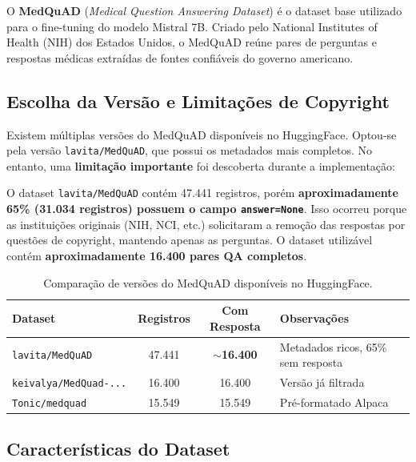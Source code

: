 O \textbf{MedQuAD} (\textit{Medical Question Answering Dataset}) é o dataset base utilizado para o fine-tuning do modelo Mistral 7B. Criado pelo National Institutes of Health (NIH) dos Estados Unidos, o MedQuAD reúne pares de perguntas e respostas médicas extraídas de fontes confiáveis do governo americano.

\subsection{Escolha da Versão e Limitações de Copyright}

Existem múltiplas versões do MedQuAD disponíveis no HuggingFace. Optou-se pela versão \texttt{lavita/MedQuAD}, que possui os metadados mais completos. No entanto, uma \textbf{limitação importante} foi descoberta durante a implementação:

\begin{warningbox}
O dataset \texttt{lavita/MedQuAD} contém 47.441 registros, porém \textbf{aproximadamente 65\% (31.034 registros) possuem o campo \texttt{answer=None}}. Isso ocorreu porque as instituições originais (NIH, NCI, etc.) solicitaram a remoção das respostas por questões de copyright, mantendo apenas as perguntas. O dataset utilizável contém \textbf{aproximadamente 16.400 pares QA completos}.
\end{warningbox}

\begin{table}[H]
\centering
\caption{Comparação de versões do MedQuAD disponíveis no HuggingFace.}
\label{tab:versoes-medquad}
\begin{tabularx}{\textwidth}{l c c X}
\toprule
\textbf{Dataset} & \textbf{Registros} & \textbf{Com Resposta} & \textbf{Observações} \\
\midrule
\texttt{lavita/MedQuAD} & 47.441 & \textbf{$\sim$16.400} & Metadados ricos, 65\% sem resposta \\
\texttt{keivalya/MedQuad-...} & 16.400 & 16.400 & Versão já filtrada \\
\texttt{Tonic/medquad} & 15.549 & 15.549 & Pré-formatado Alpaca \\
\bottomrule
\end{tabularx}
\end{table}

\subsection{Características do Dataset}


